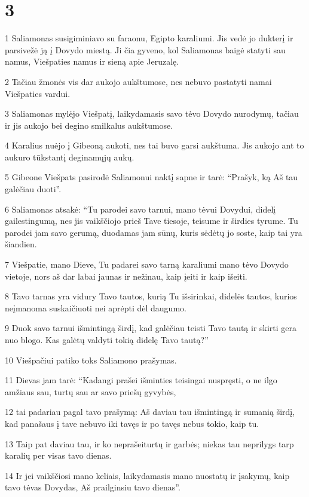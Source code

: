 \chapter{3}

\par 1 Saliamonas susigiminiavo su faraonu, Egipto karaliumi. Jis vedė jo dukterį ir parsivežė ją į Dovydo miestą. Ji čia gyveno, kol Saliamonas baigė statyti sau namus, Viešpaties namus ir sieną apie Jeruzalę. 
\par 2 Tačiau žmonės vis dar aukojo aukštumose, nes nebuvo pastatyti namai Viešpaties vardui. 
\par 3 Saliamonas mylėjo Viešpatį, laikydamasis savo tėvo Dovydo nurodymų, tačiau ir jis aukojo bei degino smilkalus aukštumose. 
\par 4 Karalius nuėjo į Gibeoną aukoti, nes tai buvo garsi aukštuma. Jis aukojo ant to aukuro tūkstantį deginamųjų aukų. 
\par 5 Gibeone Viešpats pasirodė Saliamonui naktį sapne ir tarė: “Prašyk, ką Aš tau galėčiau duoti”. 
\par 6 Saliamonas atsakė: “Tu parodei savo tarnui, mano tėvui Dovydui, didelį gailestingumą, nes jis vaikščiojo prieš Tave tiesoje, teisume ir širdies tyrume. Tu parodei jam savo gerumą, duodamas jam sūnų, kuris sėdėtų jo soste, kaip tai yra šiandien. 
\par 7 Viešpatie, mano Dieve, Tu padarei savo tarną karaliumi mano tėvo Dovydo vietoje, nors aš dar labai jaunas ir nežinau, kaip įeiti ir kaip išeiti. 
\par 8 Tavo tarnas yra vidury Tavo tautos, kurią Tu išsirinkai, didelės tautos, kurios neįmanoma suskaičiuoti nei aprėpti dėl daugumo. 
\par 9 Duok savo tarnui išmintingą širdį, kad galėčiau teisti Tavo tautą ir skirti gera nuo blogo. Kas galėtų valdyti tokią didelę Tavo tautą?” 
\par 10 Viešpačiui patiko toks Saliamono prašymas. 
\par 11 Dievas jam tarė: “Kadangi prašei išminties teisingai nuspręsti, o ne ilgo amžiaus sau, turtų sau ar savo priešų gyvybės, 
\par 12 tai padariau pagal tavo prašymą: Aš daviau tau išmintingą ir sumanią širdį, kad panašaus į tave nebuvo iki tavęs ir po tavęs nebus tokio, kaip tu. 
\par 13 Taip pat daviau tau, ir ko neprašei­turtų ir garbės; niekas tau neprilygs tarp karalių per visas tavo dienas. 
\par 14 Ir jei vaikščiosi mano keliais, laikydamasis mano nuostatų ir įsakymų, kaip tavo tėvas Dovydas, Aš prailginsiu tavo dienas”. 
